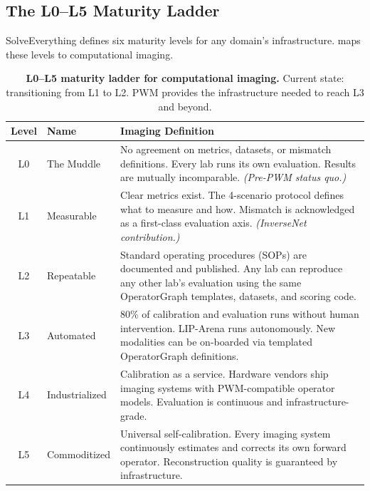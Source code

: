 \subsection{The L0--L5 Maturity Ladder}
\label{sec:maturity}

SolveEverything defines six maturity levels for any domain's
infrastructure.
 maps these levels to computational imaging.

\begin{table}[t]
\centering
\caption{%
  \textbf{L0--L5 maturity ladder for computational imaging.}
  Current state: transitioning from L1 to L2.
  PWM provides the infrastructure needed to reach L3 and beyond.%
}
\label{tab:maturity}
\smallskip
\renewcommand{\arraystretch}{1.15}
\begin{tabular}{@{}clp{7.8cm}@{}}
\toprule
\textbf{Level} & \textbf{Name}       & \textbf{Imaging Definition} \\
\midrule
L0 & The Muddle      & No agreement on metrics, datasets, or mismatch
                        definitions.  Every lab runs its own evaluation.
                        Results are mutually incomparable.
                        \emph{(Pre-PWM status quo.)} \\
L1 & Measurable      & Clear metrics exist.  The 4-scenario protocol
                        defines what to measure and how.  Mismatch is
                        acknowledged as a first-class evaluation axis.
                        \emph{(InverseNet contribution.)} \\
L2 & Repeatable      & Standard operating procedures (SOPs) are
                        documented and published.  Any lab can reproduce
                        any other lab's evaluation using the same
                        OperatorGraph templates, datasets, and scoring
                        code. \\
L3 & Automated       & 80\% of calibration and evaluation runs without
                        human intervention.  LIP-Arena runs autonomously.
                        New modalities can be on-boarded via templated
                        OperatorGraph definitions. \\
L4 & Industrialized  & Calibration as a service.  Hardware vendors ship
                        imaging systems with PWM-compatible operator
                        models.  Evaluation is continuous and
                        infrastructure-grade. \\
L5 & Commoditized    & Universal self-calibration.  Every imaging system
                        continuously estimates and corrects its own
                        forward operator.  Reconstruction quality is
                        guaranteed by infrastructure. \\
\bottomrule
\end{tabular}
\end{table}


